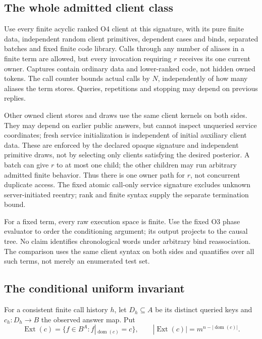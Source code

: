 \documentclass[11pt,a4paper]{article}
\theoremstyle{definition}
\newcommand{\dom}{\operatorname{dom}}
\begin{document}
\subsection{The whole admitted client class}
Use every finite acyclic ranked O4 client at this signature, with its
pure finite data, independent random client primitives, dependent cases
and binds, separated batches and fixed finite code library. Calls through
any number of aliases in a finite term are allowed, but every invocation
requiring $r$ receives its one current owner. Captures contain ordinary
data and lower-ranked code, not hidden owned tokens. The call counter
bounds actual calls by $N$, independently of how many aliases the term
stores. Queries, repetitions and stopping may depend on previous replies.

Other owned client stores and draws use the same client kernels on both
sides. They may depend on earlier public answers, but cannot inspect
unqueried service coordinates; fresh service initialization is independent
of initial auxiliary client data. These are enforced by the declared
opaque signature and independent primitive draws, not by selecting only
clients satisfying the desired posterior. A batch can give $r$ to at most
one child; the other children may run arbitrary admitted finite behavior.
Thus there is one owner path for $r$, not concurrent duplicate access.
The fixed atomic call-only service signature excludes unknown
server-initiated reentry; rank and finite syntax supply the separate
termination bound.

For a fixed term, every raw execution space is finite. Use the fixed O3
phase evaluator to order the conditioning argument; its output projects
to the causal tree. No claim identifies chronological words under arbitrary
bind reassociation. The comparison uses the same client syntax on both
sides and quantifies over all such terms, not merely an enumerated test set.

\subsection{The conditional uniform invariant}\label{sec:C-posterior}
For a consistent finite call history $h$, let $D_h\subseteq A$ be its
distinct queried keys and $c_h:D_h\to B$ the observed answer map. Put
\[
\operatorname{Ext}(c)=\{f\in B^A:f|_{\dom(c)}=c\},\qquad
|\operatorname{Ext}(c)|=m^{n-|\dom(c)|}.
\]
\end{document}
